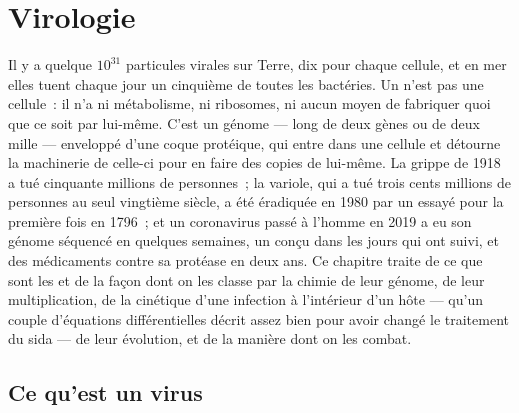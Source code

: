 \chapter{Virologie}\label{ch:b3:virology}

Il y a quelque $10^{31}$ particules virales sur Terre, dix pour chaque
cellule, et en mer elles tuent chaque jour un cinquième de toutes les
bactéries. Un  n'est pas une cellule~: il n'a ni métabolisme, ni
ribosomes, ni aucun moyen de fabriquer quoi que ce soit par lui-même.
C'est un génome --- long de deux gènes ou de deux mille --- enveloppé
d'une coque protéique, qui entre dans une cellule et détourne la
machinerie de celle-ci pour en faire des copies de lui-même. La grippe
de 1918 a tué cinquante millions de personnes~; la variole, qui a tué
trois cents millions de personnes au seul vingtième siècle, a été
éradiquée en 1980 par un  essayé pour la première fois en 1796~;
et un coronavirus passé à l'homme en 2019 a eu son génome séquencé en
quelques semaines, un  conçu dans les jours qui ont suivi, et des
médicaments contre sa protéase en deux ans. Ce chapitre traite de ce que
sont les  et de la façon dont on les classe par la chimie de leur
génome, de leur multiplication, de la cinétique d'une infection à
l'intérieur d'un hôte --- qu'un couple d'équations différentielles
décrit assez bien pour avoir changé le traitement du sida --- de leur
évolution, et de la manière dont on les combat.

\section{Ce qu'est un virus}


